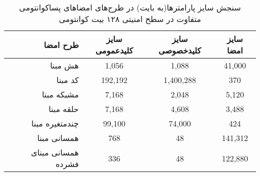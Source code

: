 \begin{center}
	\begin{table}[h]\label{tbl:comparison_signature_scheme}
	\caption{
	سنجش سایز پارامترها(به بایت) در طرح‌های امضاهای پساکوانتومی 
	\\
	متفاوت در سطح امنیتی ۱۲۸ بیت کوانتومی
	}	
	\begin{tabular}{ r | c | c | c }
		طرح امضا & سایز کلیدعمومی & سایز کلیدخصوصی & سایز امضا  \\ 
		\hline
		هش مبنا & 1,056 & 1,088 & 41,000 \\ 
		کد مبنا & 192,192 & 1,400,288 & 370 \\ 
		مشبکه مبنا & 7,168 & 2,048 & 5,120 \\ 
		حلقه مبنا & 7,168 & 4,608 & 3,488 \\ 
		چندمتغیره مبنا & 99,100 & 74,000 & 424 \\ 
		\hline
		همسانی مبنا & 768 & 48 & 141,312 \\ 
		همسانی مبنای فشرده & 336 & 48 & 122,880 \\   
	\end{tabular}
\end{table}
\end{center}


